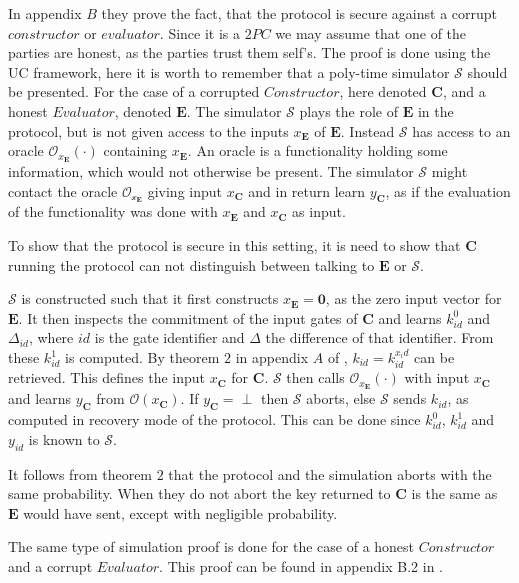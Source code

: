 \documentclass[twoside,11pt,openright]{report}
\begin{document}
\bigskip

In appendix $B$ they prove the fact, that the protocol is secure against a corrupt $constructor$ or $evaluator$. Since it is a $2PC$ we may assume that one of the parties are honest, as the parties trust them self's. The proof is done using the UC framework, here it is worth to remember that a poly-time simulator $\mathcal{S}$ should be presented. For the case of a corrupted $Constructor$, here denoted $\mathbf{C}$, and a honest $Evaluator$, denoted $\mathbf{E}$. The simulator $\mathcal{S}$ plays the role of $\mathbf{E}$ in the protocol, but is not given access to the inputs $x_{\mathbf{E}}$ of $\mathbf{E}$. Instead $\mathcal{S}$ has access to an oracle $\mathcal{O}_{x_{\mathbf{E}}}(\cdot)$ containing $x_{\mathbf{E}}$. An oracle is a functionality holding some information, which would not otherwise be present. The simulator $\mathcal{S}$ might contact the oracle $\mathcal{O_{x_{\mathbf{E}}}}$ giving input $x_{\mathbf{C}}$ and in return learn $y_{\mathbf{C}}$, as if the evaluation of the functionality was done with $x_{\mathbf{E}}$ and $x_{\mathbf{C}}$ as input.

To show that the protocol is secure in this setting, it is need to show that $\mathbf{C}$ running the protocol can not distinguish between talking to $\mathbf{E}$ or $\mathcal{S}$.

$\mathcal{S}$ is constructed such that it first constructs $x_\mathbf{E}=\mathbf{0}$, as the zero input vector for $\mathbf{E}$. It then inspects the commitment of the input gates of $\mathbf{C}$ and learns $k^0_{id}$ and $\Delta_{id}$, where $id$ is the gate identifier and $\Delta$ the difference of that identifier. From these $k^1_{id}$ is computed. By theorem $2$ in appendix $A$ of \cite{duplo}, $k_{id}=k^{x_id}_{id}$ can be retrieved. This defines the input $x_\mathbf{C}$ for $\mathbf{C}$. $\mathcal{S}$ then calls $\mathcal{O}_{x_\mathbf{E}}(\cdot)$ with input $x_\mathbf{C}$ and learns $y_\mathbf{C}$ from $\mathcal{O}(x_\mathbf{C})$. If $y_\mathbf{C}=\perp$ then $\mathcal{S}$ aborts, else $\mathcal{S}$ sends $k_{id}$, as computed in recovery mode of the protocol. This can be done since $k^0_{id}$, $k^1_{id}$ and $y_{id}$ is known to $\mathcal{S}$.

It follows from theorem $2$ that the protocol and the simulation aborts with the same probability. When they do not abort the key returned to $\mathbf{C}$ is the same as $\mathbf{E}$ would have sent, except with negligible probability.

The same type of simulation proof is done for the case of a honest $Constructor$ and a corrupt $Evaluator$. This proof can be found in appendix B.2 in \cite{duplo}.
\end{document}
